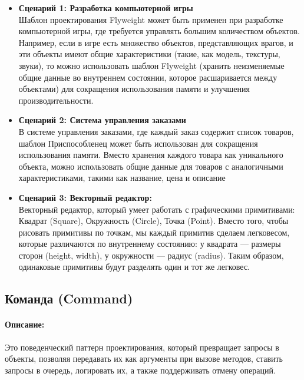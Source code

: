 \documentclass[12pt,onecolumn]{article}
\begin{document}
\begin{itemize}
  \item {
    \textbf{Сценарий 1: Разработка компьютерной игры}\\
    Шаблон проектирования Flyweight может быть применен при разработке компьютерной игры, где требуется управлять большим количеством объектов.
    Например, если в игре есть множество объектов, представляющих врагов, и эти объекты имеют общие характеристики (такие, как модель, текстуры, звуки),
    то можно использовать шаблон Flyweight (хранить неизменяемые общие данные во внутреннем состоянии, которое расшаривается между объектами) для сокращения использования
    памяти и улучшения производительности.
  }
  \item {
    \textbf{Сценарий 2: Система управления заказами}\\
    В системе управления заказами, где каждый заказ содержит список
    товаров, шаблон Приспособленец может быть использован для
    сокращения использования памяти. Вместо хранения каждого
    товара как уникального объекта, можно использовать общие данные
    для товаров с аналогичными характеристиками, такими как название,
    цена и описание
  }
  \item{
    \textbf{Сценарий 3: Векторный редактор:}\\
    Векторный редактор, который умеет работать с графическими примитивами:
    Квадрат (Square), Окружность (Circle), Точка (Point). Вместо того, чтобы рисовать примитивы по точкам, мы каждый примитив
    сделаем легковесом, которые различаются по внутреннему состоянию:
    у квадрата — размеры сторон (height, width), у окружности — радиус (radius).
    Таким образом, одинаковые примитивы будут разделять один и тот же легковес.
  }
\end{itemize}
\subsection{Команда (Command)}
\paragraph{Описание:} Это поведенческий паттерн проектирования,
который превращает запросы в объекты, позволяя
передавать их как аргументы при вызове методов, ставить
запросы в очередь, логировать их, а также поддерживать отмену операций.
\end{document}
